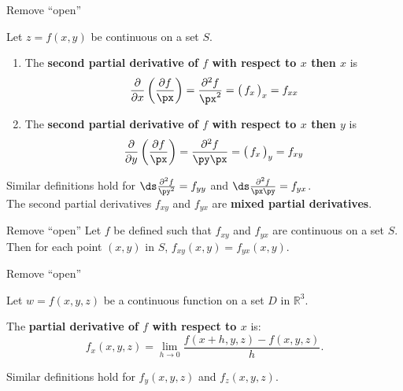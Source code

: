 \documentclass{article}
\begin{document}
Remove ``open''

{Let $z=f(x,y)$ be continuous on a set $S$.
\begin{enumerate}
	\item The \textbf{second partial derivative of $f$ with respect to $x$ then $x$} is $$\frac{\partial}{\partial x}\left(\frac{\partial f}{\px}\right) = \frac{\partial^2 f}{\px^2} = \big(\,f_x\,\big)_x = f_{xx}$$

\item The \textbf{second partial derivative of $f$ with respect to $x$ then $y$} is $$\frac{\partial}{\partial y}\left(\frac{\partial f}{\px}\right) = \frac{\partial^2f}{\py\px} = \big(\,f_x\,\big)_y = f_{xy}$$

%

\end{enumerate}

Similar definitions hold for $\ds \frac{\partial^2f}{\py^2} = f_{yy}$ and $\ds \frac{\partial^2f}{\px\py} = f_{yx}$. \\

The second partial derivatives $f_{xy}$ and $f_{yx}$ are \textbf{mixed partial derivatives}.
}

Remove ``open''
{Let $f$ be defined such that $f_{xy}$ and $f_{yx}$ are continuous on a set $S$. Then for each point $(x,y)$ in $S$, $f_{xy}(x,y) = f_{yx}(x,y)$.
}

Remove ``open''
{Let $w=f(x,y,z)$ be a continuous function on a set $D$ in $\mathbb{R}^3$. 

The \textbf{partial derivative of $f$ with respect to $x$} is:
	$$f_x(x,y,z) = \lim_{h\to 0} \frac{f(x+h,y,z)-f(x,y,z)}{h}.$$
	
	Similar definitions hold for $f_y(x,y,z)$ and $f_z(x,y,z)$.
}
\end{document}
